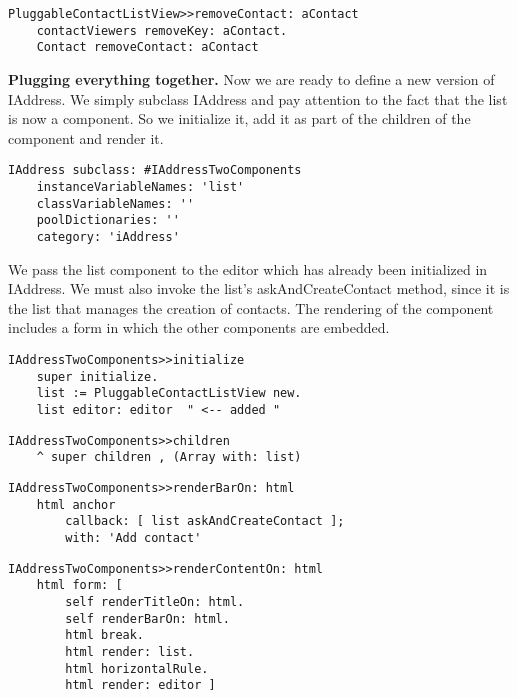 \documentclass[a4paper,10pt,twoside]{book}
\newcommand{\ct}[1]{{\small\ttfamily\textup{#1}}}
\begin{document}
\begin{lstlisting}
PluggableContactListView>>removeContact: aContact
    contactViewers removeKey: aContact.
    Contact removeContact: aContact
\end{lstlisting}

\textbf{Plugging everything together.} Now we are ready to define a new version of \ct{IAddress}. We simply subclass \ct{IAddress} and pay attention to the fact that the list is now a component. So we initialize it, add it as part of the children of the component and render it.

\begin{lstlisting}
IAddress subclass: #IAddressTwoComponents
    instanceVariableNames: 'list'
    classVariableNames: ''
    poolDictionaries: ''
    category: 'iAddress'
\end{lstlisting}

We pass the list component to the editor which has already been initialized in \ct{IAddress}. We must also invoke the list's \ct{askAndCreateContact} method, since it is the list that manages the creation of contacts. The rendering of the component includes a form in which the other components are embedded.

\begin{lstlisting}
IAddressTwoComponents>>initialize
    super initialize.
    list := PluggableContactListView new.
    list editor: editor  " <-- added "
\end{lstlisting}

\begin{lstlisting}
IAddressTwoComponents>>children
    ^ super children , (Array with: list)
\end{lstlisting}

\begin{lstlisting}
IAddressTwoComponents>>renderBarOn: html
    html anchor
        callback: [ list askAndCreateContact ]; 
        with: 'Add contact'
\end{lstlisting}

\begin{lstlisting}
IAddressTwoComponents>>renderContentOn: html
    html form: [
        self renderTitleOn: html.
        self renderBarOn: html.
        html break.
        html render: list.
        html horizontalRule.
        html render: editor ]
\end{lstlisting}
\end{document}
